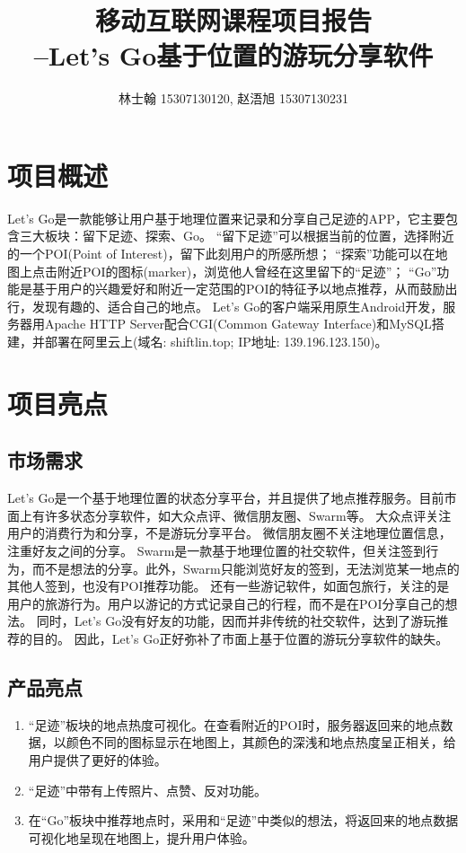 \documentclass[UTF8]{article}
\begin{document}
\begin{titlepage}
\title{\bfseries 移动互联网课程项目报告\\--Let's Go基于位置的游玩分享软件}
\author{林士翰 15307130120, 赵浯旭 15307130231}
\date{}
\maketitle
\tableofcontents
\thispagestyle{empty}
\end{titlepage}

\section{项目概述}
Let's Go是一款能够让用户基于地理位置来记录和分享自己足迹的APP，它主要包含三大板块：留下足迹、探索、Go。
“留下足迹”可以根据当前的位置，选择附近的一个POI(Point of Interest)，留下此刻用户的所感所想；
“探索”功能可以在地图上点击附近POI的图标(marker)，浏览他人曾经在这里留下的“足迹”；
“Go”功能是基于用户的兴趣爱好和附近一定范围的POI的特征予以地点推荐，从而鼓励出行，发现有趣的、适合自己的地点。
Let's Go的客户端采用原生Android开发，服务器用Apache HTTP Server配合CGI(Common Gateway Interface)和MySQL搭建，并部署在阿里云上(域名: shiftlin.top; IP地址: 139.196.123.150)。

\section{项目亮点}
\subsection{市场需求}
Let's Go是一个基于地理位置的状态分享平台，并且提供了地点推荐服务。目前市面上有许多状态分享软件，如大众点评、微信朋友圈、Swarm等。
大众点评关注用户的消费行为和分享，不是游玩分享平台。
微信朋友圈不关注地理位置信息，注重好友之间的分享。
Swarm是一款基于地理位置的社交软件，但关注签到行为，而不是想法的分享。此外，Swarm只能浏览好友的签到，无法浏览某一地点的其他人签到，也没有POI推荐功能。
还有一些游记软件，如面包旅行，关注的是用户的旅游行为。用户以游记的方式记录自己的行程，而不是在POI分享自己的想法。
同时，Let's Go没有好友的功能，因而并非传统的社交软件，达到了游玩推荐的目的。
因此，Let's Go正好弥补了市面上基于位置的游玩分享软件的缺失。

\subsection{产品亮点}
\begin{enumerate}
    \item “足迹”板块的地点热度可视化。在查看附近的POI时，服务器返回来的地点数据，以颜色不同的图标显示在地图上，其颜色的深浅和地点热度呈正相关，给用户提供了更好的体验。
    \item “足迹”中带有上传照片、点赞、反对功能。
    \item 在“Go”板块中推荐地点时，采用和“足迹”中类似的想法，将返回来的地点数据可视化地呈现在地图上，提升用户体验。
\end{enumerate}
\end{document}
